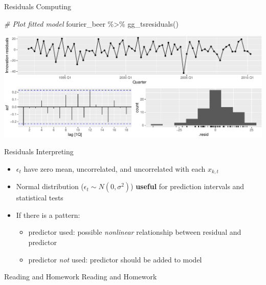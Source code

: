 \documentclass[
  ignorenonframetext,
]{beamer}
\newenvironment{Shaded}{\begin{snugshade}}{\end{snugshade}}
\newcommand{\CommentTok}[1]{\textcolor[rgb]{0.56,0.35,0.01}{\textit{#1}}}
\newcommand{\FunctionTok}[1]{\textcolor[rgb]{0.00,0.00,0.00}{#1}}
\newcommand{\NormalTok}[1]{#1}
\newcommand{\SpecialCharTok}[1]{\textcolor[rgb]{0.00,0.00,0.00}{#1}}
\providecommand{\tightlist}{%
  \setlength{\itemsep}{0pt}\setlength{\parskip}{0pt}}
\begin{document}
\begin{frame}[fragile]{Residuals \textbar{} \small Computing}
\protect\hypertarget{residuals-computing}{}
\tiny

\begin{Shaded}
\begin{Highlighting}[]
\CommentTok{\# Plot fitted model}
\NormalTok{fourier\_beer }\SpecialCharTok{\%\textgreater{}\%}
  \FunctionTok{gg\_tsresiduals}\NormalTok{()}
\end{Highlighting}
\end{Shaded}

\includegraphics{Time-series-regression-models_files/figure-beamer/unnamed-chunk-55-1.pdf}

\normalfont
\end{frame}

\begin{frame}{Residuals \textbar{} \small Interpreting}
\protect\hypertarget{residuals-interpreting}{}
\begin{itemize}
\item
  \(\epsilon_t\) have zero mean, uncorrelated, and uncorrelated with
  each \(x_{k, t}\)
\item
  Normal distribution (\(\epsilon_t \sim N(0, \sigma^2)\))
  \textbf{useful} for prediction intervals and statistical tests
\item
  If there is a pattern:

  \begin{itemize}
  \tightlist
  \item
    predictor used: possible \textit{nonlinear} relationship between
    residual and predictor
  \item
    predictor \textit{not} used: predictor should be added to model
  \end{itemize}
\end{itemize}
\end{frame}

\begin{frame}{Reading and Homework}
\protect\hypertarget{reading-and-homework}{}
\center Reading and Homework
\end{frame}
\end{document}
